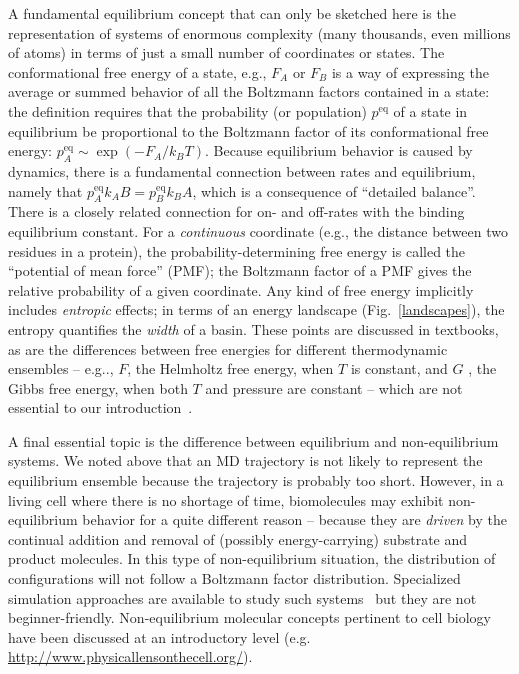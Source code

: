 \documentclass[9pt,bestpractices]{livecoms}
\newcommand{\peq}{p^{\mathrm{eq}}}
\begin{document}
A fundamental equilibrium concept that can only be sketched here is the representation of systems of enormous complexity (many thousands, even millions of atoms) in terms of just a small number of coordinates or states.  
The conformational free energy of a state, e.g., $F_A$ or $F_B$ is a way of expressing the average or summed behavior of all the Boltzmann factors contained in a state: the definition requires that the probability (or population) $\peq$ of a state in equilibrium be proportional to the Boltzmann factor of its conformational free energy: $\peq_A \sim \exp(-F_A/k_BT)$.  
Because equilibrium behavior is caused by dynamics, there is a fundamental connection between rates and equilibrium, namely that $\peq_A k_AB = \peq_B k_BA$, which is a consequence of ``detailed balance''.
There is a closely related connection for on- and off-rates with the binding equilibrium constant.   
For a \emph{continuous} coordinate (e.g., the distance between two residues in a protein), the probability-determining free energy is called the ``potential of mean force'' (PMF); the Boltzmann factor of a PMF gives the relative probability of a given coordinate.  
Any kind of free energy implicitly includes \emph{entropic} effects; in terms of an energy landscape (Fig.\ \ref{landscapes}), the entropy quantifies the \emph{width} of a basin.  
These points are discussed in textbooks, as are the differences between free energies for different thermodynamic ensembles -- e.g.., $F$, the Helmholtz free energy, when $T$ is constant, and $G$ , the Gibbs free energy, when both $T$ and pressure are constant -- which are not essential to our introduction~\cite{DillBook, Zuckerman:2010:}.

A final essential topic is the difference between equilibrium and non-equilibrium systems.  
We noted above that an MD trajectory is not likely to represent the equilibrium ensemble because the trajectory is probably too short.  
However, in a living cell where there is no shortage of time, biomolecules may exhibit non-equilibrium behavior for a quite different reason -- because they are \emph{driven} by the continual addition and removal of (possibly energy-carrying) substrate and product molecules.  
In this type of non-equilibrium situation, the distribution of configurations will not follow a Boltzmann factor distribution.  
Specialized simulation approaches are available to study such systems~\cite{Chong:2017:CurrentOpinioninStructuralBiology,  Zuckerman:2017:AnnuRevBiophys} but they are not beginner-friendly.  
Non-equilibrium molecular concepts pertinent to cell biology have been discussed at an introductory level (e.g. \url{http://www.physicallensonthecell.org/}).
\end{document}
